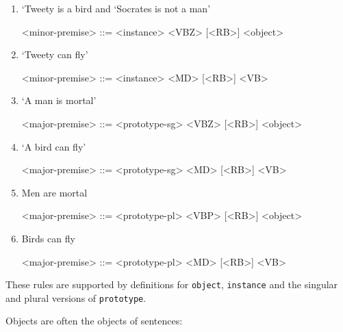 \begin{enumerate}
    \item `Tweety is a bird and `Socrates is not a man'
    \begin{grammar}
        <minor-premise> ::= <instance> <VBZ> [<RB>] <object>
    \end{grammar}
    \item `Tweety can fly'
    \begin{grammar}
        <minor-premise> ::= <instance> <MD> [<RB>] <VB>
    \end{grammar}

    \item `A man is mortal'
    \begin{grammar}
        <major-premise> ::= <prototype-sg> <VBZ> [<RB>] <object>
    \end{grammar}
    \item `A bird can fly'
    \begin{grammar}
        <major-premise> ::= <prototype-sg> <MD> [<RB>] <VB>
    \end{grammar}
    \item Men are mortal
    \begin{grammar}
        <major-premise> ::= <prototype-pl> <VBP> [<RB>] <object>
    \end{grammar}
    \item Birds can fly
    \begin{grammar}
        <major-premise> ::= <prototype-pl> <MD> [<RB>] <VB>
    \end{grammar}
\end{enumerate}

\noindent These rules are supported by definitions for \texttt{object}, \texttt{instance} and the singular and plural versions of \texttt{prototype}. 

Objects are often the objects of sentences:


